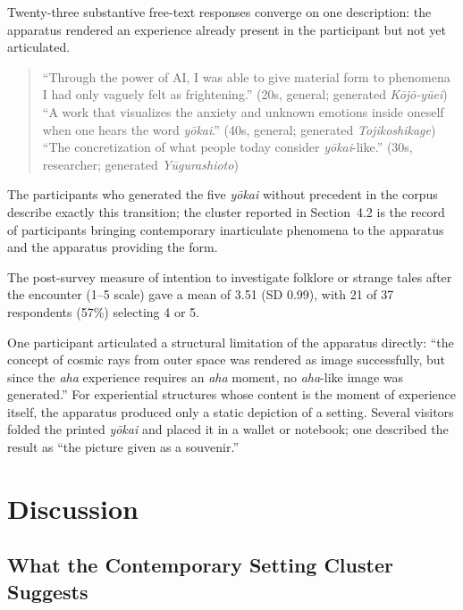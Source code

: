 \documentclass[manuscript,review,anonymous,nonacm]{acmart}
\begin{document}
Twenty-three substantive free-text responses converge on one description: the apparatus rendered an experience already present in the participant but not yet articulated.

\begin{quote}
\small
``Through the power of AI, I was able to give material form to phenomena I had only vaguely felt as frightening.'' (20s, general; generated \textit{K\=oj\=o-y\=uei})\\[2pt]
``A work that visualizes the anxiety and unknown emotions inside oneself when one hears the word \textit{y\=okai}.'' (40s, general; generated \textit{Tojikoshikage})\\[2pt]
``The concretization of what people today consider \textit{y\=okai}-like.'' (30s, researcher; generated \textit{Y\=ugurashioto})
\end{quote}

The participants who generated the five \textit{y\=okai} without precedent in the corpus describe exactly this transition; the cluster reported in Section~4.2 is the record of participants bringing contemporary inarticulate phenomena to the apparatus and the apparatus providing the form.

The post-survey measure of intention to investigate folklore or strange tales after the encounter (1--5 scale) gave a mean of 3.51 (SD 0.99), with 21 of 37 respondents (57\%) selecting 4 or 5.

One participant articulated a structural limitation of the apparatus directly: ``the concept of cosmic rays from outer space was rendered as image successfully, but since the \textit{aha} experience requires an \textit{aha} moment, no \textit{aha}-like image was generated.'' For experiential structures whose content is the moment of experience itself, the apparatus produced only a static depiction of a setting. Several visitors folded the printed \textit{y\=okai} and placed it in a wallet or notebook; one described the result as ``the picture given as a souvenir.''



\section{Discussion}

\subsection{What the Contemporary Setting Cluster Suggests}
\end{document}
